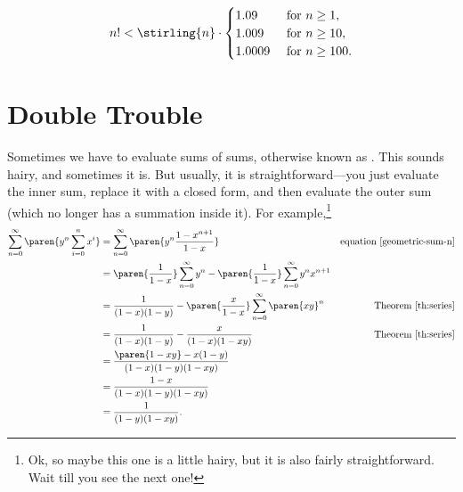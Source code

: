 \begin{corollary}\label{cor:9A2}
\begin{align*}
n! < \stirling{n} \cdot
 \begin{cases}
1.09 & \text{ for }   n \ge 1,\\
1.009 & \text{ for }  n \ge 10,\\
1.0009 & \text{ for } n \ge 100.
\end{cases}
\end{align*}

\end{corollary}


\section{Double Trouble}\label{doublesum_sec}

Sometimes we have to evaluate sums of sums, otherwise known as
.  This sounds hairy, and sometimes it is.
But usually, it is straightforward---you just evaluate the inner sum,
replace it with a closed form, and then evaluate the outer sum (which
no longer has a summation inside it).  For example,\footnote{Ok, so
  maybe this one is a little hairy, but it is also fairly
  straightforward.  Wait till you see the next one!}
\begingroup
{}
\begin{align*}
\sum_{n=0}^{\infty} \paren{y^n \sum_{i=0}^n x^i}
 & = \sum_{n=0}^{\infty} \paren{y^n \frac{1-x^{n+1}}{1-x}}
     & \text{equation~\ref{geometric-sum-n}}\\
%
 & = \paren{\frac{1}{1-x}} \sum_{n=0}^{\infty} y^n
     - \paren{\frac{1}{1-x}} \sum_{n=0}^{\infty} y^nx^{n+1} \\
%
 & = \frac{1}{(1-x)(1-y)}
    - \paren{\frac{x}{1 - x}} \sum_{n=0}^{\infty} \paren{xy}^n
      & \text{Theorem~\ref{th:series}}\\
%
 & = \frac{1}{(1-x)(1-y)} - \frac{x}{(1-x)(1-xy)}
      & \text{Theorem~\ref{th:series}}\\
%
  & = \frac{\paren{1-xy} - x(1-y)}{(1-x)(1-y)(1-xy)}\\
%
  & = \frac{1-x}{(1-x)(1-y)(1-xy)}\\
%
  & = \frac{1}{(1-y)(1-xy)}.
\end{align*}
\endgroup

